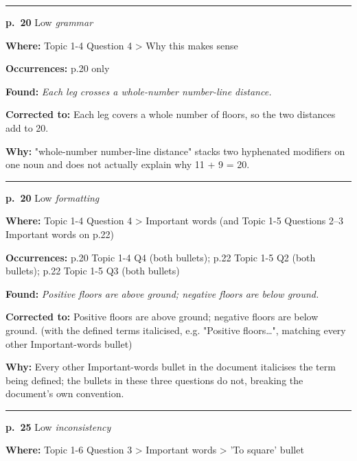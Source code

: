 \documentclass[11pt]{article}
\newcommand{\sevlow}[1]{\textcolor{black!55}{#1}}
\begin{document}
\noindent\rule{\textwidth}{0.4pt}\par\nobreak\vspace{2pt}
\noindent\textbf{p.~20} \quad \sevlow{Low} \quad \textit{grammar}\par
\noindent\textbf{Where: }Topic 1-4 Question 4 > Why this makes sense\par
\noindent\textbf{Occurrences: }p.20 only\par
\noindent\textbf{Found: }\textit{Each leg crosses a whole-number number-line distance.}\par
\noindent\textbf{Corrected to: }Each leg covers a whole number of floors, so the two distances add to 20.\par
\noindent\textbf{Why: }"whole-number number-line distance" stacks two hyphenated modifiers on one noun and does not actually explain why 11 + 9 = 20.\par\vspace{4pt}
\noindent\rule{\textwidth}{0.4pt}\par\nobreak\vspace{2pt}
\noindent\textbf{p.~20} \quad \sevlow{Low} \quad \textit{formatting}\par
\noindent\textbf{Where: }Topic 1-4 Question 4 > Important words (and Topic 1-5 Questions 2--3 Important words on p.22)\par
\noindent\textbf{Occurrences: }p.20 Topic 1-4 Q4 (both bullets); p.22 Topic 1-5 Q2 (both bullets); p.22 Topic 1-5 Q3 (both bullets)\par
\noindent\textbf{Found: }\textit{Positive floors are above ground; negative floors are below ground.}\par
\noindent\textbf{Corrected to: }Positive floors are above ground; negative floors are below ground. (with the defined terms italicised, e.g. "Positive floors\ldots", matching every other Important-words bullet)\par
\noindent\textbf{Why: }Every other Important-words bullet in the document italicises the term being defined; the bullets in these three questions do not, breaking the document's own convention.\par\vspace{4pt}
\noindent\rule{\textwidth}{0.4pt}\par\nobreak\vspace{2pt}
\noindent\textbf{p.~25} \quad \sevlow{Low} \quad \textit{inconsistency}\par
\noindent\textbf{Where: }Topic 1-6 Question 3 > Important words > 'To square' bullet\par
\end{document}
